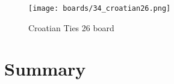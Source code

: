 \clearpage %

\noindent
\begin{figure}[h]
\texttt{[image: boards/34\_croatian26.png]}
\caption{Croatian Ties 26 board}
\label{fig:34_croatian26}
\end{figure}

\TODO

\vfill{}

\clearpage %

\section*{Summary}
\label{sec:Simple variants/Summary}

\TODO

\clearpage %
